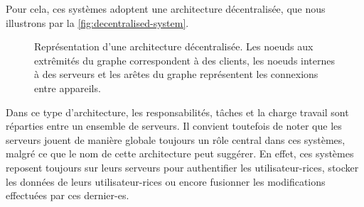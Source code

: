 Pour cela, ces systèmes adoptent une architecture décentralisée, que nous illustrons par la \autoref{fig:decentralised-system}.
\begin{figure}[!ht]
  \centering
  \caption[Caption for decentralised-system]{
    Représentation d'une architecture décentralisée\footnotemark.
    Les noeuds aux extrêmités du graphe correspondent à des clients, les noeuds internes à des serveurs et les arêtes du graphe représentent les connexions entre appareils.
  }
  \label{fig:decentralised-system}
\end{figure}

Dans ce type d'architecture, les responsabilités, tâches et la charge travail sont réparties entre un ensemble de serveurs.
Il convient toutefois de noter que les serveurs jouent de manière globale toujours un rôle central dans ces systèmes, malgré ce que le nom de cette architecture peut suggérer.
En effet, ces systèmes reposent toujours sur leurs serveurs pour authentifier les utilisateur-rices, stocker les données de leurs utilisateur-rices ou encore fusionner les modifications effectuées par ces dernier-es.\\

